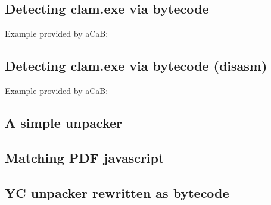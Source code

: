 \subsection{Detecting clam.exe via bytecode}
Example provided by aCaB:
\subsection{Detecting clam.exe via bytecode (disasm)}
Example provided by aCaB:

\label{prg:matchclamexedisasm}
\subsection{A simple unpacker}
\subsection{Matching PDF javascript}

\subsection{YC unpacker rewritten as bytecode}
